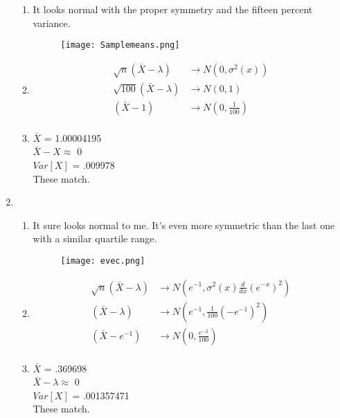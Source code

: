 \documentclass{article}
\begin{document}
\begin{enumerate}
\begin{enumerate}
	\item
		It looks normal with the proper symmetry and the fifteen percent variance.
		\begin{figure}[H]
		\texttt{[image: Samplemeans.png]}
		\end{figure}
	\item
		\begin{equation*}
		\begin{split}
		\sqrt{n}(\bar{X} - \lambda) &\rightarrow N(0,\sigma^{2}(x)) \\
		\sqrt{100}(\bar{X} - \lambda) &\rightarrow N(0,1) \\
		(\bar{X} - 1) &\rightarrow N(0,\frac{1}{100}) \\
		\end{split}
		\end{equation*}		
	\item
		$\bar{X}$ = 1.00004195 \\
		$\bar{X} - X \approx$ 0 \\
		$Var[X]$ = .009978 \\
		These match.
	\end{enumerate}
\item
	\begin{enumerate}
	\item
		It sure looks normal to me. It's even more symmetric than the last one with a similar quartile range. 
		\begin{figure}[H]
		\texttt{[image: evec.png]}
		\end{figure}
	\item
		\begin{equation*}
		\begin{split}
		\sqrt{n}(\bar{X} - \lambda) &\rightarrow N(e^{-1},\sigma^{2}(x)\frac{d}{dx}(e^{-x})^{2}) \\
		(\bar{X} - \lambda) &\rightarrow N(e^{-1},\frac{1}{100}(-e^{-1})^{2}) \\
		(\bar{X} - e^{-1}) &\rightarrow N(0,\frac{e^{-2}}{100}) \\
		\end{split}
		\end{equation*}
	\item
		$\bar{X}$ = .369698 \\
		$\bar{X} - \lambda \approx$ 0 \\
		$Var[X]$ = .001357471 \\
		These match.
	\end{enumerate}
\end{enumerate}
\end{document}
